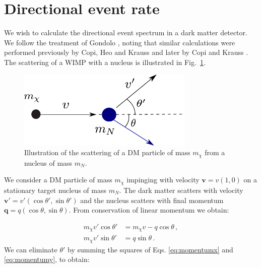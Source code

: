 

\section{Directional event rate}

We wish to calculate the directional event spectrum in a dark matter detector. We follow the treatment of Gondolo \cite{Gondolo:2002}, noting that similar calculations were performed previously by Copi, Heo and Krauss \cite{Copi:1999} and later by Copi and Krauss \cite{Copi:2001}. The scattering of a WIMP with a nucleus is illustrated in Fig.~\ref{fig:directional:scattering}. 

\begin{figure}[h!]
  \centering
  \includegraphics[width=0.75\textwidth]{Directional/Scattering.pdf}
\caption[Illustration of DM-nucleus scattering]{Illustration of the scattering of a DM particle of mass $m_\chi$ from a nucleus of mass $m_N$.}
  \label{fig:directional:scattering}
\end{figure}

We consider a DM particle of mass \(m_\chi\) impinging with velocity \(\textbf{v} = v\left(1,0\right)\) on a stationary target nucleus of mass \(m_N\). The dark matter scatters with velocity \(\textbf{v}' = v'\left(\cos \theta',\sin \theta'\right)\) and the nucleus scatters with final momentum \(\textbf{q} = q\left(\cos \theta, \sin \theta\right)\). From conservation of linear momentum we obtain:

\begin{align}
m_\chi v' \cos \theta' &= m_\chi v - q\cos \theta \,, \label{eq:momentumx}\\
m_\chi v' \sin \theta' &= q \sin \theta \,. \label{eq:momentumy}
\end{align}
We can eliminate \(\theta'\) by summing the squares of Eqs. \ref{eq:momentumx} and \ref{eq:momentumy}, to obtain:

